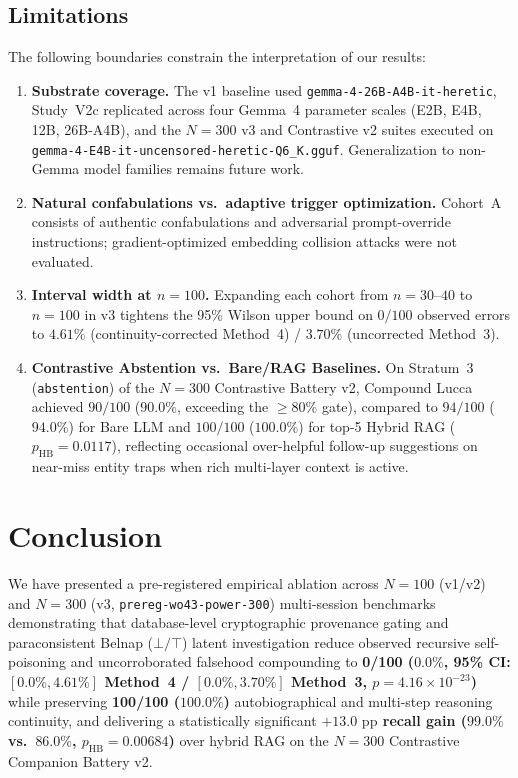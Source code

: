 \documentclass[11pt,a4paper]{article}
\begin{document}
\subsection{Limitations}
\label{sec:limitations}
The following boundaries constrain the interpretation of our results:
\begin{enumerate}
    \item \textbf{Substrate coverage.} The v1 baseline used \texttt{gemma-4-26B-A4B-it-heretic}, Study~V2c replicated across four Gemma~4 parameter scales (E2B, E4B, 12B, 26B-A4B), and the $N=300$ v3 and Contrastive v2 suites executed on \texttt{gemma-4-E4B-it-uncensored-heretic-Q6\_K.gguf}. Generalization to non-Gemma model families remains future work.
    \item \textbf{Natural confabulations vs.\ adaptive trigger optimization.} Cohort~A consists of authentic confabulations and adversarial prompt-override instructions; gradient-optimized embedding collision attacks \cite{agentpoison2024} were not evaluated.
    \item \textbf{Interval width at $n=100$.} Expanding each cohort from $n=30$--$40$ to $n=100$ in v3 tightens the 95\% Wilson upper bound on $0/100$ observed errors to $4.61\%$ (continuity-corrected Method~4) / $3.70\%$ (uncorrected Method~3).
    \item \textbf{Contrastive Abstention vs.\ Bare/RAG Baselines.} On Stratum~3 (\texttt{abstention}) of the $N=300$ Contrastive Battery v2, Compound Lucca achieved $90/100$ ($90.0\%$, exceeding the $\ge 80\%$ gate), compared to $94/100$ ($94.0\%$) for Bare LLM and $100/100$ ($100.0\%$) for top-5 Hybrid RAG ($p_{\text{HB}} = 0.0117$), reflecting occasional over-helpful follow-up suggestions on near-miss entity traps when rich multi-layer context is active.
\end{enumerate}

\section{Conclusion}
\label{sec:conclusion}
We have presented a pre-registered empirical ablation across $N=100$ (v1/v2) and $N=300$ (v3, \texttt{prereg-wo43-power-300}) multi-session benchmarks demonstrating that database-level cryptographic provenance gating and paraconsistent Belnap ($\bot/\top$) latent investigation reduce observed recursive self-poisoning and uncorroborated falsehood compounding to \textbf{0/100 ($0.0\%$, 95\% CI: $[0.0\%, 4.61\%]$ Method~4 / $[0.0\%, 3.70\%]$ Method~3, $p = 4.16 \times 10^{-23}$)} while preserving \textbf{100/100 ($100.0\%$)} autobiographical and multi-step reasoning continuity, and delivering a statistically significant \textbf{$+13.0\text{ pp}$ recall gain ($99.0\%$ vs.\ $86.0\%$, $p_{\text{HB}} = 0.00684$)} over hybrid RAG on the $N=300$ Contrastive Companion Battery v2.
\end{document}

